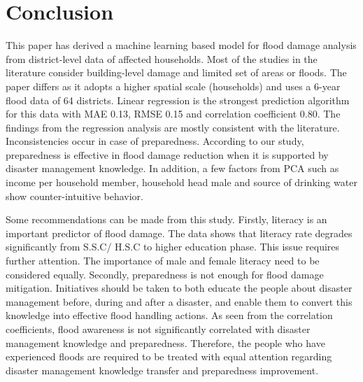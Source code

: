 \documentclass[preprint,review,12pt]{elsarticle}
\begin{document}
\section{Conclusion}
This paper has derived a machine learning based model for flood damage analysis from district-level data of affected households. Most of the studies in the literature consider building-level damage and limited set of areas or floods. The paper differs as it adopts a higher spatial scale (households) and uses a 6-year flood data of 64 districts. Linear regression is the strongest prediction algorithm for this data with MAE 0.13, RMSE 0.15 and correlation coefficient 0.80. The findings from the regression analysis are mostly consistent with the literature. Inconsistencies occur in case of preparedness. According to our study, preparedness is effective in flood damage reduction when it is supported by disaster management knowledge. In addition, a few factors from PCA such as income per household member, household head male and source of drinking water show counter-intuitive behavior.

Some recommendations can be made from this study. Firstly, literacy is an important predictor of flood damage. The data shows that literacy rate degrades significantly from S.S.C/ H.S.C to higher education phase. This issue requires further attention. The importance of male and female literacy need to be considered equally. Secondly, preparedness is not enough for flood damage mitigation. Initiatives should be taken to both educate the people about disaster management before, during and after a disaster, and enable them to convert this knowledge into effective flood handling actions. As seen from the correlation coefficients, flood awareness is not significantly correlated with disaster management knowledge and preparedness. Therefore, the people who have experienced floods are required to be treated with equal attention regarding disaster management knowledge transfer and preparedness improvement.

\noindent 



\end{document}
